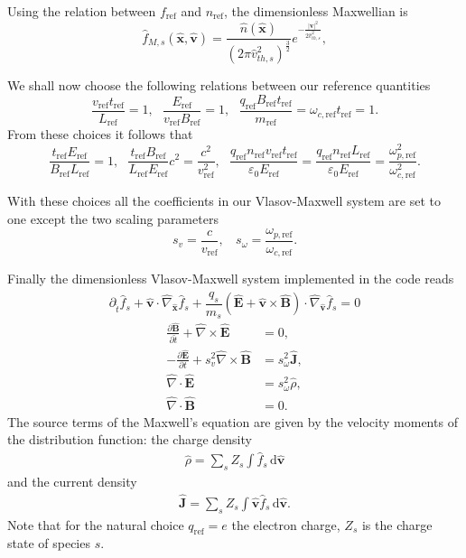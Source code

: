 \documentclass[english]{article}
\newcommand{\bx}{\textbf{x}}
\newcommand{\bv}{\textbf{v}}
\newcommand{\bB}{\textbf{B}}
\newcommand{\bE}{\textbf{E}}
\newcommand{\bJ}{\textbf{J}}
\newcommand{\du}{\,\mathrm{d}}
\newcommand{\tr}{t_{\mathrm{ref}}}
\newcommand{\xr}{L_{\mathrm{ref}}}
\newcommand{\nr}{n_{\mathrm{ref}}}
\newcommand{\fr}{f_{\mathrm{ref}}}
\newcommand{\qr}{q_{\mathrm{ref}}}
\newcommand{\mr}{m_{\mathrm{ref}}}
\newcommand{\Br}{B_{\mathrm{ref}}}
\newcommand{\Er}{E_{\mathrm{ref}}}
\newcommand{\vr}{v_{\mathrm{ref}}}
\newcommand{\ompr}{\omega_{p,\mathrm{ref}}}
\newcommand{\omcr}{\omega_{c,\mathrm{ref}}}
\newcommand{\nablaht}{\hat{\nabla}}
\newcommand{\nablaxht}{\hat{\nabla}_{\xht}}
\newcommand{\nablavht}{\hat{\nabla}_{\vht}}
\newcommand{\tht}{\hat{t}}
\newcommand{\xht}{\hat{\bx}}
\newcommand{\vht}{\hat{\bv}}
\newcommand{\qht}{\hat{q}}
\newcommand{\mht}{\hat{m}}
\newcommand{\Eht}{\hat{\bE}}
\newcommand{\Bht}{\hat{\bB}}
\newcommand{\Jht}{\hat{\bJ}}
\newcommand{\rhoht}{\hat{\rho}}
\newcommand{\nht}{\hat{n}}
\newcommand{\fht}{\hat{f}}
\begin{document}
Using the relation between $\fr$ and $\nr$, the dimensionless Maxwellian is 
\begin{equation}\label{eq:maxwellianD}
	\fht_{M,s}(\xht,\vht)= \frac{\nht(\xht)}{(2\pi \hat{v}_{th,s}^2)^{\frac 32}} e^{-\frac{|\bv|^2}{2\hat{v}_{th,s}^2}},
\end{equation}	

We shall now choose the following relations between our reference quantities
\begin{equation}
	\frac{\vr\tr}{\xr}=1, ~~~ \frac{\Er}{\vr\Br}=1, ~~~ \frac{\qr\Br\tr}{\mr} = \omcr\tr =1.
\end{equation} 	
From these choices it follows that
\begin{equation}
	\frac{\tr \Er}{\Br\xr} = 1, ~~~ \frac{\tr\Br}{\xr\Er} c^2 = \frac{c^2}{\vr^2}, ~~~
	\frac{\qr\nr\vr\tr}{\varepsilon_0\Er}= \frac{\qr\nr\xr}{\varepsilon_0\Er}= \frac{\ompr^2}{\omcr^2}.
\end{equation}

With these choices all the coefficients in our Vlasov-Maxwell system are set to one except the two scaling parameters
\begin{equation}
	s_v = \frac{c}{\vr}, ~~~~ s_\omega = \frac{\ompr}{\omcr}.
\end{equation}

Finally the dimensionless Vlasov-Maxwell system implemented in the code reads
\begin{equation}\label{eq:Vlasovt}
	\partial_{\tht} \fht_s + \vht \cdot \nablaxht \fht_s +  \frac{\qht_s}{\mht_s} \left( \Eht + \vht \times \Bht \right) \cdot \nablavht \fht_s = 0
	\end{equation}
	\begin{subequations}
	\begin{align}
	\frac{\partial \Bht}{\partial \tht} + \nablaht \times \Eht &= 0 , \\
	-  \frac{\partial \Eht}{\partial t} + s_v^2\nablaht \times \Bht &= s_\omega^2\Jht , \\
	\nablaht \cdot \Eht &= s_\omega^2\rhoht,\\
	\nablaht \cdot \Bht &= 0.
	\end{align}
	\end{subequations}
	The source terms of the Maxwell's equation are given by the velocity moments of the distribution function: the charge density
	\begin{align*}
	\rhoht= \sum_s Z_s \int \fht_s \du\vht
	\end{align*}
	and the current density
	\begin{align*}
	\Jht =\sum_s Z_s\int \vht \fht_s \du\vht.
	\end{align*}
	Note that for the natural choice $\qr=e$ the electron charge, $Z_s$ is the charge state of species $s$.
\end{document}
